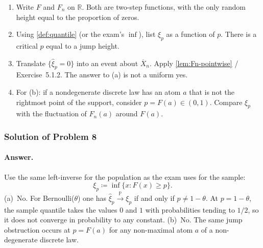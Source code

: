 \documentclass[11pt,a4paper]{article}
\DeclareMathOperator{\Pbb}{\mathbb{P}}
\begin{document}
\begin{remark}
\label{rem:p8-hints}
\begin{enumerate}[label=\textup{(\arabic*)}]
    \item
    Write \(F\) and \(F_n\) on \(\mathbb{R}\). Both are two-step functions, with the only random height equal to the proportion of zeros.
    \item
    Using \cref{def:quantile} (or the exam's \(\inf\)), list \(\xi_p\) as a function of \(p\). There is a critical \(p\) equal to a jump height.
    \item
    Translate \(\{\hat{\xi}_p=0\}\) into an event about \(\overline{X}_n\). Apply \cref{lem:Fn-pointwise} / Exercise~5.1.2. The answer to (a) is not a uniform yes.
    \item
    For (b): if a nondegenerate discrete law has an atom \(a\) that is not the rightmost point of the support, consider \(p=F(a)\in(0,1)\). Compare \(\xi_p\) with the fluctuation of \(F_n(a)\) around \(F(a)\).
\end{enumerate}
\end{remark}

\subsubsection{Solution of Problem 8}

\paragraph{Answer.}

Use the same left-inverse for the population as the exam uses for the sample:
\[
\xi_p
\coloneqq
\inf\{x:F(x)\ge p\}.
\]
(a)~No. For Bernoulli(\(\theta\)) one has \(\hat{\xi}_p\xrightarrow{\Pbb}\xi_p\) if and only if \(p\neq 1-\theta\). At \(p=1-\theta\), the sample quantile takes the values \(0\) and \(1\) with probabilities tending to \(1/2\), so it does not converge in probability to any constant.
(b)~No. The same jump obstruction occurs at \(p=F(a)\) for any non-maximal atom \(a\) of a non-degenerate discrete law.
\end{document}

